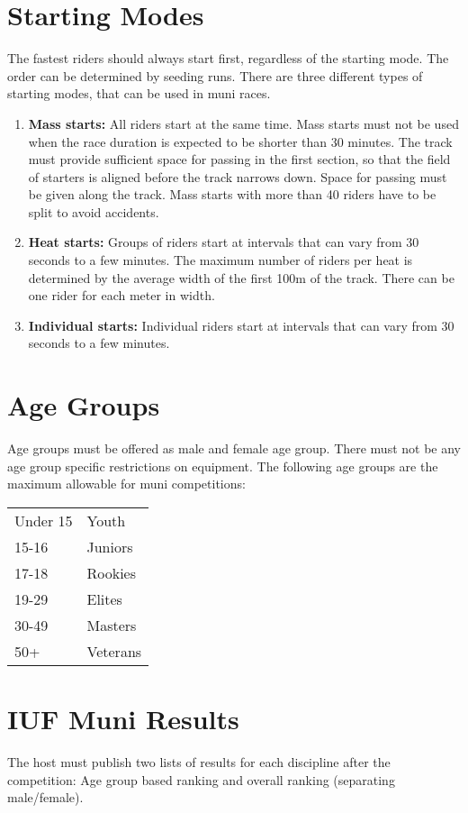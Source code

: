 \section{Starting Modes}
The fastest riders should always start first, regardless of the starting mode.
The order can be determined by seeding runs.
There are three different types of starting modes, that can be used in muni races.
\begin{enumerate}
\item \textbf{Mass starts:} All riders start at the same time.
Mass starts must not be used when the race duration is expected to be shorter than 30 minutes.
The track must provide sufficient space for passing in the first section, so that the field of starters is aligned before the track narrows down.
Space for passing must be given along the track.
Mass starts with more than 40 riders have to be split to avoid accidents.
\item \textbf{Heat starts:} Groups of riders start at intervals that can vary from 30 seconds to a few minutes.
The maximum number of riders per heat is determined by the average width of the first 100m of the track.
There can be one rider for each meter in width.
\item \textbf{Individual starts:} Individual riders start at intervals that can vary from 30 seconds to a few minutes.
\end{enumerate}

\section{Age Groups}
Age groups must be offered as male and female age group.
There must not be any age group specific restrictions on equipment.
The following age groups are the maximum allowable for muni competitions:

\begin{tabular}{ l l}
Under 15 & Youth \\
15-16 & Juniors \\
17-18 & Rookies \\
19-29 & Elites \\
30-49 & Masters \\
50+ & Veterans \\
\end{tabular}

\section{IUF Muni Results}
The host must publish two lists of results for each discipline after the competition: Age group based ranking and overall ranking (separating
male/female).


